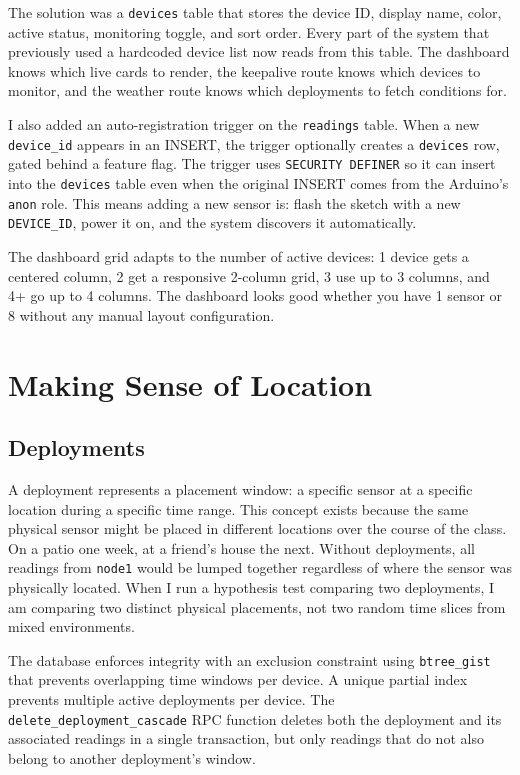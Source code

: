 \documentclass[11pt, letterpaper]{article}
\begin{document}
The solution was a \texttt{devices} table that stores the device ID, display name, color, active status, monitoring toggle, and sort order. Every part of the system that previously used a hardcoded device list now reads from this table. The dashboard knows which live cards to render, the keepalive route knows which devices to monitor, and the weather route knows which deployments to fetch conditions for.

I also added an auto-registration trigger on the \texttt{readings} table. When a new \texttt{device\_id} appears in an INSERT, the trigger optionally creates a \texttt{devices} row, gated behind a feature flag. The trigger uses \texttt{SECURITY DEFINER} so it can insert into the \texttt{devices} table even when the original INSERT comes from the Arduino's \texttt{anon} role. This means adding a new sensor is: flash the sketch with a new \texttt{DEVICE\_ID}, power it on, and the system discovers it automatically.

The dashboard grid adapts to the number of active devices: 1 device gets a centered column, 2 get a responsive 2-column grid, 3 use up to 3 columns, and 4+ go up to 4 columns. The dashboard looks good whether you have 1 sensor or 8 without any manual layout configuration.


\section{Making Sense of Location}

\subsection{Deployments}

A deployment represents a placement window: a specific sensor at a specific location during a specific time range. This concept exists because the same physical sensor might be placed in different locations over the course of the class. On a patio one week, at a friend's house the next. Without deployments, all readings from \texttt{node1} would be lumped together regardless of where the sensor was physically located. When I run a hypothesis test comparing two deployments, I am comparing two distinct physical placements, not two random time slices from mixed environments.

The database enforces integrity with an exclusion constraint using \texttt{btree\_gist} that prevents overlapping time windows per device. A unique partial index prevents multiple active deployments per device. The \texttt{delete\_deployment\_cascade} RPC function deletes both the deployment and its associated readings in a single transaction, but only readings that do not also belong to another deployment's window.
\end{document}
